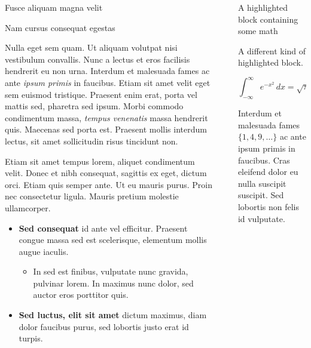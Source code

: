 \documentclass[final]{beamer}
\newlength{\sepwidth}
\newlength{\colwidth}
\newcommand{\separatorcolumn}{\begin{column}{\sepwidth}\end{column}}
\begin{document}
\begin{frame}[t]
\begin{columns}[t]
\begin{column}{\colwidth}
\begin{block}{Fusce aliquam magna velit}
  \end{block}

  \begin{block}{Nam cursus consequat egestas}

    Nulla eget sem quam. Ut aliquam volutpat nisi vestibulum convallis. Nunc a
    lectus et eros facilisis hendrerit eu non urna. Interdum et malesuada fames
    ac ante \textit{ipsum primis} in faucibus. Etiam sit amet velit eget sem
    euismod tristique. Praesent enim erat, porta vel mattis sed, pharetra sed
    ipsum. Morbi commodo condimentum massa, \textit{tempus venenatis} massa
    hendrerit quis. Maecenas sed porta est. Praesent mollis interdum lectus,
    sit amet sollicitudin risus tincidunt non.

    Etiam sit amet tempus lorem, aliquet condimentum velit. Donec et nibh
    consequat, sagittis ex eget, dictum orci. Etiam quis semper ante. Ut eu
    mauris purus. Proin nec consectetur ligula. Mauris pretium molestie
    ullamcorper. 

    \begin{itemize}
      \item \textbf{Sed consequat} id ante vel efficitur. Praesent congue massa
        sed est scelerisque, elementum mollis augue iaculis.
        \begin{itemize}
          \item In sed est finibus, vulputate
            nunc gravida, pulvinar lorem. In maximus nunc dolor, sed auctor eros
            porttitor quis.
        \end{itemize}
      \item \textbf{Sed luctus, elit sit amet} dictum maximus, diam dolor
        faucibus purus, sed lobortis justo erat id turpis.
    \end{itemize}

  \end{block}
    
\end{column}

\separatorcolumn

\begin{column}{\colwidth}

    \begin{exampleblock}{A highlighted block containing some math}

    A different kind of highlighted block.

    $$
    \int_{-\infty}^{\infty} e^{-x^2}\,dx = \sqrt{\pi}
    $$

    Interdum et malesuada fames $\{1, 4, 9, \ldots\}$ ac ante ipsum primis in
    faucibus. Cras eleifend dolor eu nulla suscipit suscipit. Sed lobortis non
    felis id vulputate.


\end{exampleblock}
\end{column}
\end{columns}
\end{frame}
\end{document}
